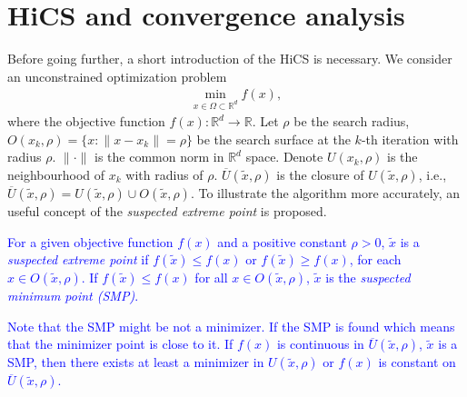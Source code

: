 \documentclass[mathpazo]{csam}
\newcommand{\bbR}{\mathbb{R}}
\theoremstyle{remark}
\begin{document}
\section{HiCS and convergence analysis}
\label{sec:algorithm}

Before going further, a short introduction of the HiCS is necessary.
We consider an unconstrained optimization problem 
\begin{align}
	\min_{x\in\Omega\subset\mathbb{R}^d} f(x),
	\label{}
\end{align}
where the objective function $f(x):\bbR^d\rightarrow \bbR$.
Let $\rho$ be the search radius, $O(x_k, \rho)=\{x:
\|x-x_k \|=\rho\}$ be the search surface at the
$k$-th iteration with radius $\rho$. $\|\cdot \|$ is the common
norm in $\bbR^d$ space. Denote $U(x_k, \rho)$ is the neighbourhood of
$x_k$ with radius of $\rho$.  
$\overline{U}(\tilde{x}, \rho)$ is the closure of $U(\tilde{x}, \rho)$, i.e., 
$\overline{U}(\tilde{x}, \rho) = U(\tilde{x}, \rho)\cup O(\tilde{x}, \rho) $.
To illustrate the algorithm more accurately, an useful concept of the
\textit{suspected extreme point} is proposed.

\textcolor{blue}{
\begin{definition}	
	For a given objective function $f(x)$ and a positive constant 
	$\rho>0$, $\tilde{x}$ is a \textit{suspected extreme point} if
	$f(\tilde x)\leq f(x)$ or $f(\tilde x)\geq f(x)$, for each $x \in O(\tilde{x},\rho)$.
	If $f(\tilde x) \leq f(x)$ for all $x\in O(\tilde{x},\rho)$,
	$\tilde{x}$ is the \textit{suspected minimum point (SMP)}.
\end{definition}
\begin{remark}
	Note that the SMP might be not a minimizer. If the SMP is found which means
	that the minimizer point is close to it.
	If $f(x)$ is continuous in $\overline{U}(\tilde{x}, \rho)$,
	$\tilde x$ is a SMP, then there exists at least a minimizer in $U(\tilde x,
	\rho)$ or $f(x)$ is constant on $\overline{U}(\tilde x, \rho)$.
\end{remark}
}
\end{document}
